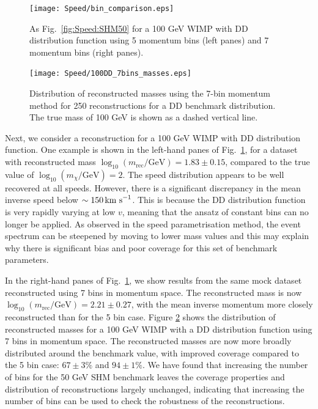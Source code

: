  \begin{figure}[t]
\centering
  \texttt{[image: Speed/bin\_comparison.eps]}
\caption{As Fig.\ \ref{fig:Speed:SHM50} for a 100 GeV WIMP with DD distribution function using 5 momentum bins (left panes) and 7 momentum bins (right panes).}
  \label{fig:Speed:DD100}
\end{figure}

\begin{figure}[t]
\centering
\texttt{[image: Speed/100DD\_7bins\_masses.eps]}
\caption[Distribution of reconstructed masses using the 7-bin momentum method for a DD benchmark distribution.]{Distribution of reconstructed masses using the 7-bin momentum method for 250 reconstructions for a DD benchmark distribution. The true mass of 100 GeV is shown as a dashed vertical line.}
  \label{fig:Speed:7bins}
\end{figure}

Next, we consider a reconstruction for a 100 GeV WIMP with DD distribution function. One example is shown in the left-hand panes of Fig.\ \ref{fig:Speed:DD100}, for a dataset with reconstructed mass \(\log_{10}(m_\textrm{rec} / \textrm{GeV}) = 1.83 \pm 0.15\), compared to the true value of \(\log_{10}(m_\chi / \textrm{GeV}) = 2\). The speed distribution appears to be well recovered at all speeds. However, there is a significant discrepancy in the mean inverse speed below \(\sim 150 \,\textrm{km s}^{-1}\). This is because the DD distribution function is very rapidly varying at low \(v\), meaning that the ansatz of constant bins can no longer be applied. As observed in the speed parametrisation method, the event spectrum can be steepened by moving to lower mass values and this may explain why there is significant bias and poor coverage for this set of benchmark parameters. 

In the right-hand panes of Fig.\ \ref{fig:Speed:DD100}, we show results from the same mock dataset reconstructed using 7 bins in momentum space. The reconstructed mass is now \(\log_{10}(m_\textrm{rec} / \textrm{GeV}) = 2.21 \pm 0.27\), with the mean inverse momentum more closely reconstructed than for the 5 bin case. Figure \ref{fig:Speed:7bins} shows the distribution of reconstructed masses for a 100 GeV WIMP with a DD distribution function using 7 bins in momentum space. The reconstructed masses are now more broadly distributed around the benchmark value, with improved coverage compared to the 5 bin case: \(67 \pm 3 \%\) and \(94 \pm 1 \%\). We have found that increasing the number of bins for the 50 GeV SHM benchmark leaves the coverage properties and distribution of reconstructions largely unchanged, indicating that increasing the number of bins can be used to check the robustness of the reconstructions.


